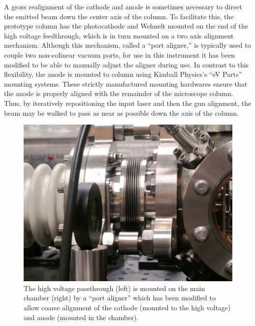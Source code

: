 A gross realignment of the cathode and anode is sometimes necessary to direct the emitted beam down the center axis of the column.
To facilitate this, the prototype column has the photocathode and Wehnelt mounted on the end of the high voltage feedthrough, which is in turn mounted on a two axis alignment mechanism.
Although this mechanism, called a ``port aligner,'' is typically used to couple two non-colinear vacuum ports, for use in this instrument it has been modified to be able to manually adjust the aligner during use.
In contrast to this flexibility, the anode is mounted to column using Kimball Physics's ``eV Parts'' mounting systems.
These strictly manufactured mounting hardwares ensure that the anode is properly aligned with the remainder of the microscope column.
Thus, by iteratively repositioning the input laser and then the gun alignment, the beam may be walked to pass as near as possible down the axis of the column.

\begin{figure}
  \centering
  \includegraphics{aligner.jpg}
  \caption[Picture of the high-voltage side of the prototype UEM]{
    The high voltage passthrough (left) is mounted on the main chamber (right) by a ``port aligner'' which has been modified to allow coarse alignment of the cathode (mounted to the high voltage) and anode (mounted in the chamber).
  }
  \label{fig:aligner-pic}
\end{figure}



